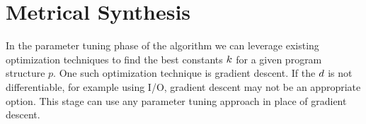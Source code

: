\section{Metrical Synthesis}
\label{sec:opt}

In the parameter tuning phase of the algorithm we can leverage existing optimization techniques to find the best constants ${k}$ for a given program structure $p$.
One such optimization technique is gradient descent.
If the ${d}$ is not differentiable, for example using I/O, gradient descent may not be an appropriate option.
This stage can use any parameter tuning approach in place of gradient descent.


